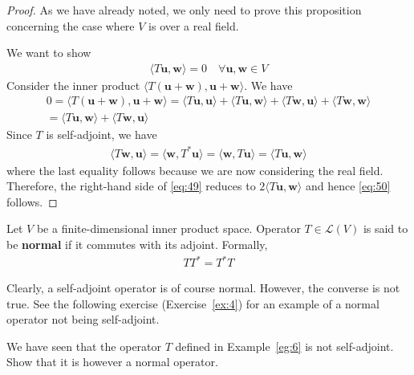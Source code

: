 \documentclass[thmcnt=section, color=blue, 12pt]{my-elegantbook}
\begin{document}
\begin{proof}
	As we have already noted, we only need to prove this proposition
	concerning the case where $V$ is over a real field.

	We want to show 
	\begin{align}
		\langle T \mathbf{u}, \mathbf{w} \rangle = 0
		\quad \forall \mathbf{u}, \mathbf{w} \in V
		\label{eq:50}
	\end{align}
	Consider the inner product $\langle T(\mathbf{u} + \mathbf{w}), \mathbf{u} + \mathbf{w} \rangle$.
	We have 
	\begin{multline}
		0 = \langle T(\mathbf{u} + \mathbf{w}), \mathbf{u} + \mathbf{w} \rangle
		= \langle T\mathbf{u}, \mathbf{u} \rangle
		+ \langle T\mathbf{u}, \mathbf{w} \rangle
		+ \langle T\mathbf{w}, \mathbf{u} \rangle
		+ \langle T\mathbf{w}, \mathbf{w} \rangle \\
		= \langle T\mathbf{u}, \mathbf{w} \rangle
		+ \langle T\mathbf{w}, \mathbf{u} \rangle
		\label{eq:49}
	\end{multline}
	Since $T$ is self-adjoint, we have 
	\begin{align*}
		\langle T \mathbf{w}, \mathbf{u} \rangle
		= \langle \mathbf{w}, T^\ast \mathbf{u} \rangle
		= \langle \mathbf{w}, T \mathbf{u} \rangle
		= \langle T \mathbf{u}, \mathbf{w} \rangle
	\end{align*}
	where the last equality follows because 
	we are now considering the real field. 
	Therefore, the right-hand side of \eqref{eq:49}
	reduces to $2 \langle T\mathbf{u}, \mathbf{w} \rangle$
	and hence \eqref{eq:50} follows.
\end{proof}


\begin{definition} \label{def:5}
	Let $V$ be a finite-dimensional inner product space.
	Operator $T \in \mathcal{L}(V)$ is said to be \textbf{normal} if 
	it commutes with its adjoint.
	Formally,
	\begin{align*}
		T T^\ast = T^\ast T
	\end{align*}
\end{definition}

Clearly, a self-adjoint operator is of course normal.
However, the converse is not true.
See the following exercise (Exercise~\ref{ex:4}) for an example
of a normal operator not being self-adjoint.

\begin{exercise} \label{ex:4}
	We have seen that the operator $T$ defined 
	in Example~\ref{eg:6} is not self-adjoint.
	Show that it is however a normal operator.
\end{exercise}
\end{document}
